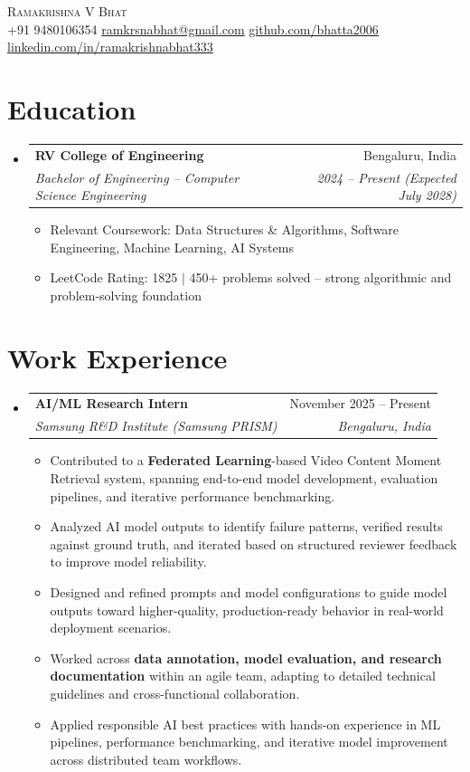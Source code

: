 \documentclass[letterpaper,11pt]{article}
\makeatletter
\newcommand{\resumeItem}[1]{
  \item\small{
    {#1 \vspace{-2pt}}
  }
}
\newcommand{\resumeSubheading}[4]{
  \vspace{-2pt}\item
    \begin{tabular*}{0.97\textwidth}[t]{l@{\extracolsep{\fill}}r}
      \textbf{#1} & #2 \\
      \textit{\small#3} & \textit{\small #4} \\
    \end{tabular*}\vspace{-7pt}
}
\newcommand{\resumeSubHeadingListStart}{\begin{itemize}[leftmargin=0.15in, label={}]}
\newcommand{\resumeSubHeadingListEnd}{\end{itemize}}
\newcommand{\resumeItemListStart}{\begin{itemize}}
\newcommand{\resumeItemListEnd}{\end{itemize}\vspace{-5pt}}
\makeatother
\begin{document}
\begin{center}
    {\Huge \scshape Ramakrishna V Bhat} \\ \vspace{4pt}
    \small
    +91 9480106354 \quad
    \href{mailto:ramkrsnabhat@gmail.com}{ramkrsnabhat@gmail.com} \quad
    \href{https://github.com/bhatta2006}{github.com/bhatta2006} \quad
    \href{https://linkedin.com/in/ramakrishnabhat333}{linkedin.com/in/ramakrishnabhat333}
\end{center}

\section{Education}
  \resumeSubHeadingListStart
    \resumeSubheading
      {RV College of Engineering}{Bengaluru, India}
      {Bachelor of Engineering -- Computer Science Engineering}{2024 -- Present (Expected July 2028)}
      \resumeItemListStart
        \resumeItem{Relevant Coursework: Data Structures \& Algorithms, Software Engineering, Machine Learning, AI Systems}
        \resumeItem{LeetCode Rating: 1825 $|$ 450+ problems solved -- strong algorithmic and problem-solving foundation}
      \resumeItemListEnd
  \resumeSubHeadingListEnd

\section{Work Experience}
  \resumeSubHeadingListStart
    \resumeSubheading
      {AI/ML Research Intern}{November 2025 -- Present}
      {Samsung R\&D Institute (Samsung PRISM)}{Bengaluru, India}
      \resumeItemListStart
        \resumeItem{Contributed to a \textbf{Federated Learning}-based Video Content Moment Retrieval system, spanning end-to-end model development, evaluation pipelines, and iterative performance benchmarking.}
        \resumeItem{Analyzed AI model outputs to identify failure patterns, verified results against ground truth, and iterated based on structured reviewer feedback to improve model reliability.}
        \resumeItem{Designed and refined prompts and model configurations to guide model outputs toward higher-quality, production-ready behavior in real-world deployment scenarios.}
        \resumeItem{Worked across \textbf{data annotation, model evaluation, and research documentation} within an agile team, adapting to detailed technical guidelines and cross-functional collaboration.}
        \resumeItem{Applied responsible AI best practices with hands-on experience in ML pipelines, performance benchmarking, and iterative model improvement across distributed team workflows.}
      \resumeItemListEnd
  \resumeSubHeadingListEnd
\end{document}
